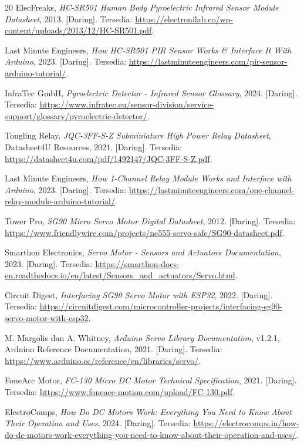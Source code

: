 \begin{thebibliography}{20}
ElecFreaks,
\textit{HC-SR501 Human Body Pyroelectric Infrared Sensor Module Datasheet},
2013. [Daring]. Tersedia: \url{https://electronilab.co/wp-content/uploads/2013/12/HC-SR501.pdf}.

Last Minute Engineers,
\textit{How HC-SR501 PIR Sensor Works \& Interface It With Arduino},
2023. [Daring]. Tersedia: \url{https://lastminuteengineers.com/pir-sensor-arduino-tutorial/}.

InfraTec GmbH,
\textit{Pyroelectric Detector - Infrared Sensor Glossary},
2024. [Daring]. Tersedia: \url{https://www.infratec.eu/sensor-division/service-support/glossary/pyroelectric-detector/}.

Tongling Relay,
\textit{JQC-3FF-S-Z Subminiature High Power Relay Datasheet},
Datasheet4U Resources, 2021. [Daring]. Tersedia: \url{https://datasheet4u.com/pdf/1492147/JQC-3FF-S-Z.pdf}.

Last Minute Engineers,
\textit{How 1-Channel Relay Module Works and Interface with Arduino},
2023. [Daring]. Tersedia: \url{https://lastminuteengineers.com/one-channel-relay-module-arduino-tutorial/}.

Tower Pro,
\textit{SG90 Micro Servo Motor Digital Datasheet},
2012. [Daring]. Tersedia: \url{https://www.friendlywire.com/projects/ne555-servo-safe/SG90-datasheet.pdf}.

Smarthon Electronics,
\textit{Servo Motor - Sensors and Actuators Documentation},
2023. [Daring]. Tersedia: \url{https://smarthon-docs-en.readthedocs.io/en/latest/Sensors_and_actuators/Servo.html}.

Circuit Digest,
\textit{Interfacing SG90 Servo Motor with ESP32},
2022. [Daring]. Tersedia: \url{https://circuitdigest.com/microcontroller-projects/interfacing-sg90-servo-motor-with-esp32}.

M. Margolis dan A. Whitney,
\textit{Arduino Servo Library Documentation},
v1.2.1, Arduino Reference Documentation, 2021. [Daring]. Tersedia: \url{https://www.arduino.cc/reference/en/libraries/servo/}.

FoneAcc Motor,
\textit{FC-130 Micro DC Motor Technical Specification},
2021. [Daring]. Tersedia: \url{https://www.foneacc-motion.com/upload/FC-130.pdf}.

ElectroComps,
\textit{How Do DC Motors Work: Everything You Need to Know About Their Operation and Uses},
2024. [Daring]. Tersedia: \url{https://electrocomps.in/how-do-dc-motors-work-everything-you-need-to-know-about-their-operation-and-uses/}.

\end{thebibliography}
